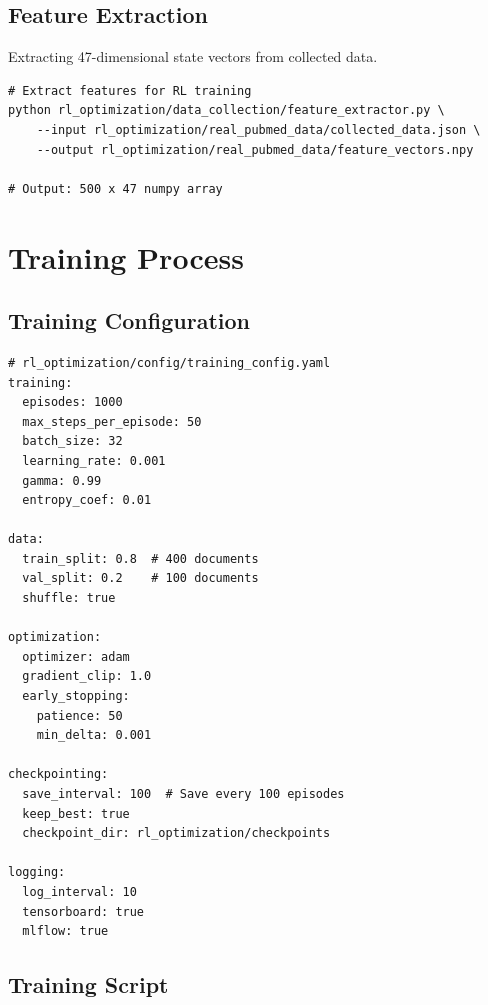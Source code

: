\subsection{Feature Extraction}

Extracting 47-dimensional state vectors from collected data.

\begin{lstlisting}[style=bashstyle]
# Extract features for RL training
python rl_optimization/data_collection/feature_extractor.py \
    --input rl_optimization/real_pubmed_data/collected_data.json \
    --output rl_optimization/real_pubmed_data/feature_vectors.npy

# Output: 500 x 47 numpy array
\end{lstlisting}

\section{Training Process}

\subsection{Training Configuration}

\begin{lstlisting}[style=pythonstyle]
# rl_optimization/config/training_config.yaml
training:
  episodes: 1000
  max_steps_per_episode: 50
  batch_size: 32
  learning_rate: 0.001
  gamma: 0.99
  entropy_coef: 0.01

data:
  train_split: 0.8  # 400 documents
  val_split: 0.2    # 100 documents
  shuffle: true

optimization:
  optimizer: adam
  gradient_clip: 1.0
  early_stopping:
    patience: 50
    min_delta: 0.001

checkpointing:
  save_interval: 100  # Save every 100 episodes
  keep_best: true
  checkpoint_dir: rl_optimization/checkpoints

logging:
  log_interval: 10
  tensorboard: true
  mlflow: true
\end{lstlisting}

\subsection{Training Script}

